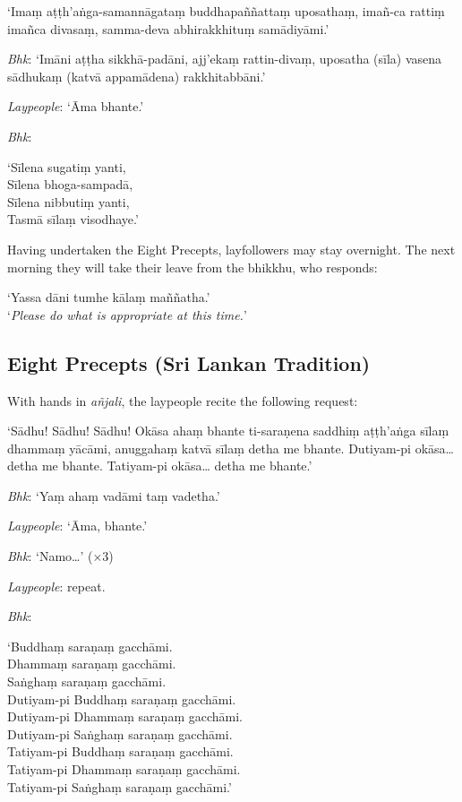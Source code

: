 ‘Imaṃ aṭṭh'aṅga-samannāgataṃ buddhapaññattaṃ uposathaṃ, imañ-ca rattiṃ imañca
divasaṃ, samma-deva abhirakkhituṃ samādiyāmi.’

\emph{Bhk}: ‘Imāni aṭṭha sikkhā-padāni, ajj'ekaṃ rattin-divaṃ, uposatha (sīla)
vasena sādhukaṃ (katvā appamādena) rakkhitabbāni.’

\emph{Laypeople}: ‘Āma bhante.’

\emph{Bhk}:

‘Sīlena sugatiṃ yanti,\\
Sīlena bhoga-sampadā,\\
Sīlena nibbutiṃ yanti,\\
Tasmā sīlaṃ visodhaye.’

Having undertaken the Eight Precepts, layfollowers may stay overnight. The next
morning they will take their leave from the bhikkhu, who responds:

‘Yassa dāni tumhe kālaṃ maññatha.’\\
‘\emph{Please do what is appropriate at this time.}’


\subsection{Eight Precepts (Sri Lankan Tradition)}

With hands in \emph{añjali}, the laypeople recite the following request:

‘Sādhu! Sādhu! Sādhu! Okāsa ahaṃ bhante ti-saraṇena saddhiṃ aṭṭh'aṅga sīlaṃ
dhammaṃ yācāmi, anuggahaṃ katvā sīlaṃ detha me bhante. Dutiyam-pi okāsa… detha
me bhante. Tatiyam-pi okāsa… detha me bhante.’

\emph{Bhk}: ‘Yaṃ ahaṃ vadāmi taṃ vadetha.’

\emph{Laypeople}: ‘Āma, bhante.’

\emph{Bhk}: ‘Namo…’ (×3)

\emph{Laypeople}: repeat.

\emph{Bhk}:

‘Buddhaṃ saraṇaṃ gacchāmi.\\
Dhammaṃ saraṇaṃ gacchāmi.\\
Saṅghaṃ saraṇaṃ gacchāmi.\\
Dutiyam-pi Buddhaṃ saraṇaṃ gacchāmi.\\
Dutiyam-pi Dhammaṃ saraṇaṃ gacchāmi.\\
Dutiyam-pi Saṅghaṃ saraṇaṃ gacchāmi.\\
Tatiyam-pi Buddhaṃ saraṇaṃ gacchāmi.\\
Tatiyam-pi Dhammaṃ saraṇaṃ gacchāmi.\\
Tatiyam-pi Saṅghaṃ saraṇaṃ gacchāmi.’

